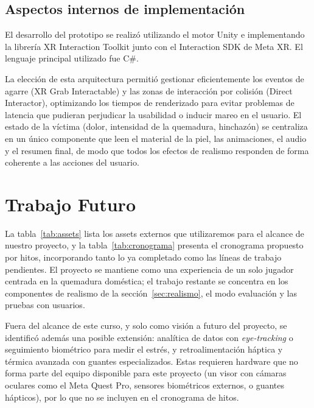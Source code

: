 \documentclass[11pt,letterpaper]{article}
\begin{document}
\subsection{Aspectos internos de implementación}

El desarrollo del prototipo se realizó utilizando el motor Unity e implementando la librería XR Interaction Toolkit junto con el Interaction SDK de Meta XR. El lenguaje principal utilizado fue C\#.

La elección de esta arquitectura permitió gestionar eficientemente los eventos de agarre (XR Grab Interactable) y las zonas de interacción por colisión (Direct Interactor), optimizando los tiempos de renderizado para evitar problemas de latencia que pudieran perjudicar la usabilidad o inducir mareo en el usuario. El estado de la víctima (dolor, intensidad de la quemadura, hinchazón) se centraliza en un único componente que leen el material de la piel, las animaciones, el audio y el resumen final, de modo que todos los efectos de realismo responden de forma coherente a las acciones del usuario.

\section{Trabajo Futuro}

La tabla~\ref{tab:assets} lista los assets externos que utilizaremos para el alcance de nuestro proyecto, y la tabla~\ref{tab:cronograma} presenta el cronograma propuesto por hitos, incorporando tanto lo ya completado como las líneas de trabajo pendientes. El proyecto se mantiene como una experiencia de un solo jugador centrada en la quemadura doméstica; el trabajo restante se concentra en los componentes de realismo de la sección~\ref{sec:realismo}, el modo evaluación y las pruebas con usuarios.

Fuera del alcance de este curso, y solo como visión a futuro del proyecto, se identificó además una posible extensión: analítica de datos con \textit{eye-tracking} o seguimiento biométrico para medir el estrés, y retroalimentación háptica y térmica avanzada con guantes especializados. Estas requieren hardware que no forma parte del equipo disponible para este proyecto (un visor con cámaras oculares como el Meta Quest Pro, sensores biométricos externos, o guantes hápticos), por lo que no se incluyen en el cronograma de hitos.
\end{document}
